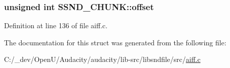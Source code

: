 \subsubsection[{\texorpdfstring{offset}{offset}}]{\setlength{\rightskip}{0pt plus 5cm}unsigned {\bf int} S\+S\+N\+D\+\_\+\+C\+H\+U\+N\+K\+::offset}\hypertarget{struct_s_s_n_d___c_h_u_n_k_a8f02ade90ed73ecf75f44dc4a7d924e9}{}\label{struct_s_s_n_d___c_h_u_n_k_a8f02ade90ed73ecf75f44dc4a7d924e9}


Definition at line 136 of file aiff.\+c.



The documentation for this struct was generated from the following file\+:\begin{DoxyCompactItemize}
\item 
C\+:/\+\_\+dev/\+Open\+U/\+Audacity/audacity/lib-\/src/libsndfile/src/\hyperlink{aiff_8c}{aiff.\+c}\end{DoxyCompactItemize}
